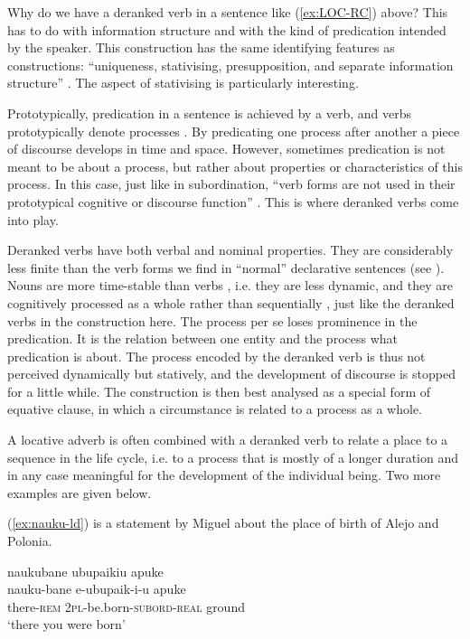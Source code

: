 Why do we have a deranked verb in a sentence like (\ref{ex:LOC-RC}) above? This has to do with information structure and with the kind of predication intended by the speaker. This construction has the same identifying features as  constructions: “uniqueness, stativising, presupposition, and separate information structure” \citep[1]{DelinOberlander2005}. The aspect of stativising is particularly interesting. 

Prototypically, predication in a sentence is achieved by a verb, and verbs prototypically denote processes \citep[cf.][259]{Cristofaro2003}. By predicating one process after another a piece of discourse develops in time and space. However, sometimes predication is not meant to be about a process, but rather about properties or characteristics of this process. In this case, just like in subordination, “verb forms are not used in their prototypical cognitive or discourse function” \citep[257]{Cristofaro2003}. This is where deranked verbs come into play.

Deranked verbs have both verbal and nominal properties. They are considerably less finite than the verb forms we find in “normal” declarative sentences (see ). Nouns are more time-stable than verbs \citep[33]{Payne1997}, i.e. they are less dynamic, and they are cognitively processed as a whole rather than sequentially \citep[259]{Cristofaro2003}, just like the deranked verbs in the construction here. The process per se loses prominence in the predication. It is the relation between one entity and the process what predication is about. The process encoded by the deranked verb is thus not perceived dynamically but statively, and the development of discourse is stopped for a little while. The construction is then best analysed as a special form of equative clause, in which a circumstance is related to a process as a whole.

A locative adverb is often combined with a deranked verb to relate a place to a sequence in the life cycle, i.e. to a process that is mostly of a longer duration and in any case meaningful for the development of the individual being. Two more examples are given below.

(\ref{ex:nauku-ld}) is a statement by Miguel about the place of birth of Alejo and Polonia.

\ea\label{ex:nauku-ld}
\begingl
\glpreamble naukubane ubupaikiu apuke\\
\gla nauku-bane e-ubupaik-i-u apuke\\
\glb there-\textsc{rem} 2\textsc{pl}-be.born-\textsc{subord}-\textsc{real} ground\\
\glft ‘there you were born’
\endgl
\trailingcitation{[mty-p110906l.035]}
\xe


